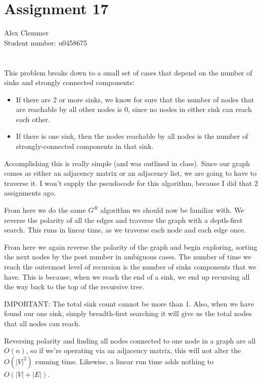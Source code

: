 \documentclass[a4paper]{article}
\begin{document}
\section*{Assignment 17}
Alex Clemmer\\
Student number: u0458675

\section*{}

This problem breaks down to a small set of cases that depend on the number of sinks and strongly connected components:

\begin{itemize}
\item If there are 2 or more sinks, we know for sure that the number of nodes that are reachable by all other nodes is 0, since no nodes in either sink can reach each other.
\item If there is one sink, then the nodes reachable by all nodes is the number of strongly-connected components in that sink.
\end{itemize}

Accomplishing this is really simple (and was outlined in class). Since our graph comes as either an adjacency matrix or an adjacency list, we are going to have to traverse it. I won't supply the pseudocode for this algorithm, because I did that 2 assignments ago.

From here we do the same $G^R$ algorithm we should now be familiar with. We reverse the polarity of all the edges and traverse the graph with a depth-first search. This runs in linear time, as we traverse each node and each edge once.

From here we again reverse the polarity of the graph and begin exploring, sorting the next nodes by the post number in ambiguous cases. The number of time we reach the outermost level of recursion is the number of sinks components that we have. This is because, when we reach the end of a sink, we end up recursing all the way back to the top of the recursive tree. 

IMPORTANT: The total sink count cannot be more than 1. Also, when we have found our one sink, simply breadth-first searching it will give us the total nodes that all nodes can reach.

Reversing polarity and finding all nodes connected to one node in a graph are all $O(n)$, so if we're operating via an adjacency matrix, this will not alter the $O(|V|^2)$ running time. Likewise, a linear run time adds nothing to $O(|V| + |E|)$.
\end{document}
